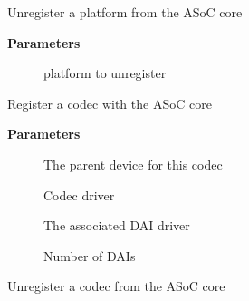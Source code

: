 \documentclass[a4paper,8pt,english]{sphinxmanual}
\begin{document}
\begin{fulllineitems}
\label{sound/kernel-api/alsa-driver-api:c.snd_soc_unregister_platform}
Unregister a platform from the ASoC core

\end{fulllineitems}


\textbf{Parameters}
\begin{description}
\item[{}] \leavevmode
platform to unregister

\end{description}

\begin{fulllineitems}
\label{sound/kernel-api/alsa-driver-api:c.snd_soc_register_codec}
Register a codec with the ASoC core

\end{fulllineitems}


\textbf{Parameters}
\begin{description}
\item[{}] \leavevmode
The parent device for this codec

\item[{}] \leavevmode
Codec driver

\item[{}] \leavevmode
The associated DAI driver

\item[{}] \leavevmode
Number of DAIs

\end{description}

\begin{fulllineitems}
\label{sound/kernel-api/alsa-driver-api:c.snd_soc_unregister_codec}
Unregister a codec from the ASoC core

\end{fulllineitems}
\end{document}
